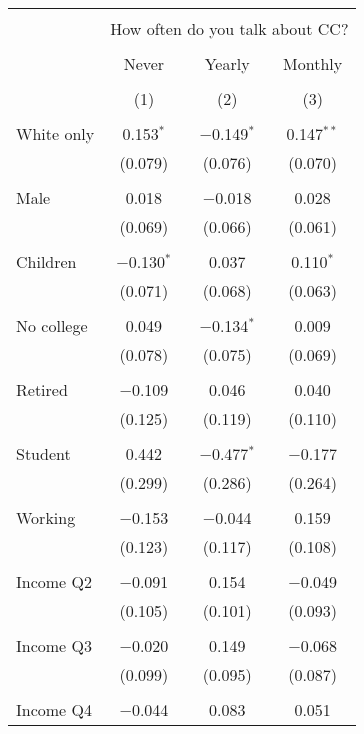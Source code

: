 
\begin{tabular}{@{\extracolsep{5pt}}lccc} 
\\[-1.8ex]\hline 
\hline \\[-1.8ex] 
 & \multicolumn{3}{c}{How often do you talk about CC?} \\ 
\cline{2-4} 
\\[-1.8ex] & Never & Yearly & Monthly \\ 
\\[-1.8ex] & (1) & (2) & (3)\\ 
\hline \\[-1.8ex] 
 White only & 0.153$^{*}$ & $-$0.149$^{*}$ & 0.147$^{**}$ \\ 
  & (0.079) & (0.076) & (0.070) \\ 
  & & & \\ 
 Male & 0.018 & $-$0.018 & 0.028 \\ 
  & (0.069) & (0.066) & (0.061) \\ 
  & & & \\ 
 Children & $-$0.130$^{*}$ & 0.037 & 0.110$^{*}$ \\ 
  & (0.071) & (0.068) & (0.063) \\ 
  & & & \\ 
 No college & 0.049 & $-$0.134$^{*}$ & 0.009 \\ 
  & (0.078) & (0.075) & (0.069) \\ 
  & & & \\ 
 Retired & $-$0.109 & 0.046 & 0.040 \\ 
  & (0.125) & (0.119) & (0.110) \\ 
  & & & \\ 
 Student & 0.442 & $-$0.477$^{*}$ & $-$0.177 \\ 
  & (0.299) & (0.286) & (0.264) \\ 
  & & & \\ 
 Working & $-$0.153 & $-$0.044 & 0.159 \\ 
  & (0.123) & (0.117) & (0.108) \\ 
  & & & \\ 
 Income Q2 & $-$0.091 & 0.154 & $-$0.049 \\ 
  & (0.105) & (0.101) & (0.093) \\ 
  & & & \\ 
 Income Q3 & $-$0.020 & 0.149 & $-$0.068 \\ 
  & (0.099) & (0.095) & (0.087) \\ 
  & & & \\ 
 Income Q4 & $-$0.044 & 0.083 & 0.051 \\ 

\end{tabular}
